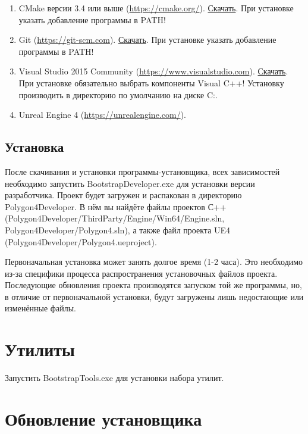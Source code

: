 \documentclass[a4paper,12pt]{report}
\newcommand{\ue}{UE4\xspace}
\begin{document}
\begin{enumerate}
\item CMake версии 3.4 или выше (\url{https://cmake.org/}).  \href{https://cmake.org/files/v3.4/cmake-3.4.0-win32-x86.exe}{Скачать}. При установке указать добавление программы в PATH!
\item Git (\url{https://git-scm.com}). \href{https://git-scm.com/download/win}{Скачать}. При установке указать добавление программы в PATH!
\item Visual Studio 2015 Community (\url{https://www.visualstudio.com}). \href{https://go.microsoft.com/fwlink/?LinkId=691978}{Скачать}. При установке обязательно выбрать компоненты Visual C++! Установку производить в директорию по умолчанию на диске C:.
\item Unreal Engine 4 (\url{https://unrealengine.com/}).
\end{enumerate}

\subsection{Установка}

После скачивания и установки программы-установщика, всех зависимостей необходимо запустить BootstrapDeveloper.exe для установки версии разработчика.
Проект будет загружен и распакован в директорию \\Polygon4Developer.
В нём вы найдёте файлы проектов С++ \\(Polygon4Developer/ThirdParty/Engine/Win64/Engine.sln,\\ Polygon4Developer/Polygon4.sln), а также файл проекта \ue\\ (Polygon4Developer/Polygon4.ueproject).

Первоначальная установка может занять долгое время (1-2 часа).
Это необходимо из-за специфики процесса распространения установочных файлов проекта.
Последующие обновления проекта производятся запуском той же программы, но, в отличие от первоначальной установки, будут загружены лишь недостающие или изменённые файлы.


\section{Утилиты}

Запустить BootstrapTools.exe для установки набора утилит.


\section{Обновление установщика}
\end{document}
